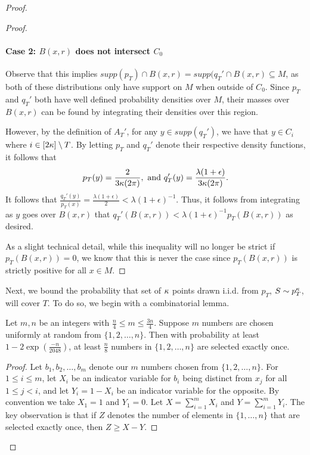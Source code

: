 \begin{proof}
\begin{proof}
\paragraph{Case 2: $B(x, r)$ does not intersect $C_0$} Observe that this implies $supp(p_T) \cap B(x, r) = supp(q_T' \cap B(x, r) \subseteq M$, as both of these distributions only have support on $M$ when outside of $C_0$. Since $p_T$ and $q_T'$ both have well defined probability densities over $M$, their masses over $B(x, r)$ can be found by integrating their densities over this region. 

However, by the definition of $A_T'$, for any $y \in supp(q_T')$, we have that $y \in C_i$ where $i \in [2\kappa] \setminus T$. By letting $p_T$ and $q_T'$ denote their respective density functions, it follows that $$p_T(y) = \frac{2}{3\kappa(2\pi)},\text{ and }q_T'(y) = \frac{\lambda(1+\epsilon)}{3\kappa(2\pi)}.$$ It follows that $\frac{q_T'(y)}{p_T(x)} = \frac{\lambda(1 + \epsilon)}{2} < \lambda(1+\epsilon)^{-1}.$ Thus, it follows from integrating as $y$ goes over $B(x, r)$ that $q_T'(B(x, r)) < \lambda(1+\epsilon)^{-1}p_T(B(x, r))$ as desired. 

As a slight technical detail, while this inequality will no longer be strict if $p_T(B(x, r)) = 0$, we know that this is never the case since $p_T(B(x, r))$ is strictly positive for all $x \in M$. 

\end{proof}

Next, we bound the probability that set of $\kappa$ points drawn i.i.d. from $p_T$, $S \sim p_T^\kappa$, will cover $T$. To do so, we begin with a combinatorial lemma. 

\begin{lemma}\label{lem:combinatorics}
Let $m, n$ be an integers with $\frac{n}{4} \leq m \leq \frac{3n}{4}$. Suppose $m$ numbers are chosen uniformly at random from $\{1, 2, \dots, n\}$. Then with probability at least $1 - 2\exp\left(\frac{-n}{2048}\right)$, at least $\frac{n}{8}$ numbers in $\{1, 2, \dots, n\}$ are selected exactly once.
\end{lemma}

\begin{proof}
Let $b_1, b_2, \dots, b_m$ denote our $m$ numbers chosen from $\{1, 2, \dots, n\}$. For $1 \leq i \leq m$, let $X_i$ be an indicator variable for $b_i$ being distinct from $x_j$ for all $1 \leq j < i$, and let $Y_i = 1 - X_i$ be an indicator variable for the opposite. By convention we take $X_1 = 1$ and $Y_1 = 0$. Let $X = \sum_{i = 1}^m X_i$ and $Y = \sum_{i= 1}^m Y_i$. The key observation is that if $Z$ denotes the number of elements in $\{1, \dots, n\}$ that are selected exactly once, then $Z \geq X- Y$.


\end{proof}
\end{proof}
